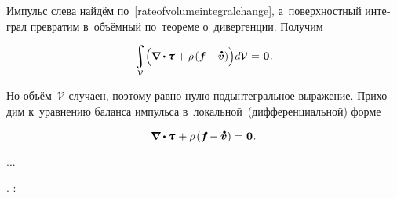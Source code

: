 \begin{otherlanguage}{russian}

\noindent
Импульс слева найдём по~\eqref{rateofvolumeintegralchange}, а~поверхностный интеграл превратим в~объёмный по~теореме о~дивергенции.
Получим

\nopagebreak\vspace{-0.1em}\begin{equation*}
\scalebox{.96}{$\displaystyle\integral\displaylimits_{\mathcal{V}} \hspace{-0.5ex} \left(^{\mathstrut} \hspace{-0.16ex} \boldnabla \dotp \cauchystress \hspace{.15ex}
+ \rho \hspace{-0.1ex} \left( \bm{f} \hspace{-0.2ex} - \mathdotabove{\bm{v}} \right) \right) \hspace{-0.33ex} d\mathcal{V}$} \hspace{.1ex}
= \hspace{.1ex} \zerovector
\hspace{.1ex} .
\end{equation*}

\vspace{-0.25em}\noindent
Но объём~$\mathcal{V}$ случаен, поэтому равно нулю подынтегральное выражение.
Приходим к~уравнению баланса импульса в~локальной~(дифференциальной) форме

\nopagebreak\vspace{-0.1em}\begin{equation}\label{balanceoftranslationalmomentum.local}
\boldnabla \dotp \cauchystress \hspace{.15ex}
+ \rho \hspace{-0.1ex} \left( \bm{f} \hspace{-0.2ex} - \mathdotabove{\bm{v}} \right)
= \hspace{.1ex} \zerovector
\hspace{.1ex} .
\end{equation}

...

  .
:


\end{otherlanguage}
